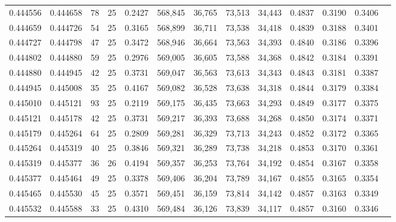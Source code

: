 \begin{tabular}{rrrrrrrrrrrrr}
0.444556 & 0.444658 &    78 &  25 &                                     0.2427 & 568,845 &  36,765 &  73,513 &  34,443 & 0.4837 & 0.3190 & 0.3406 \\
0.444659 & 0.444726 &    54 &  25 &                                     0.3165 & 568,899 &  36,711 &  73,538 &  34,418 & 0.4839 & 0.3188 & 0.3401 \\
0.444727 & 0.444798 &    47 &  25 &                                     0.3472 & 568,946 &  36,664 &  73,563 &  34,393 & 0.4840 & 0.3186 & 0.3396 \\
0.444802 & 0.444880 &    59 &  25 &                                     0.2976 & 569,005 &  36,605 &  73,588 &  34,368 & 0.4842 & 0.3184 & 0.3391 \\
0.444880 & 0.444945 &    42 &  25 &                                     0.3731 & 569,047 &  36,563 &  73,613 &  34,343 & 0.4843 & 0.3181 & 0.3387 \\
0.444945 & 0.445008 &    35 &  25 &                                     0.4167 & 569,082 &  36,528 &  73,638 &  34,318 & 0.4844 & 0.3179 & 0.3384 \\
0.445010 & 0.445121 &    93 &  25 &                                     0.2119 & 569,175 &  36,435 &  73,663 &  34,293 & 0.4849 & 0.3177 & 0.3375 \\
0.445121 & 0.445178 &    42 &  25 &                                     0.3731 & 569,217 &  36,393 &  73,688 &  34,268 & 0.4850 & 0.3174 & 0.3371 \\
0.445179 & 0.445264 &    64 &  25 &                                     0.2809 & 569,281 &  36,329 &  73,713 &  34,243 & 0.4852 & 0.3172 & 0.3365 \\
0.445264 & 0.445319 &    40 &  25 &                                     0.3846 & 569,321 &  36,289 &  73,738 &  34,218 & 0.4853 & 0.3170 & 0.3361 \\
0.445319 & 0.445377 &    36 &  26 &                                     0.4194 & 569,357 &  36,253 &  73,764 &  34,192 & 0.4854 & 0.3167 & 0.3358 \\
0.445377 & 0.445464 &    49 &  25 &                                     0.3378 & 569,406 &  36,204 &  73,789 &  34,167 & 0.4855 & 0.3165 & 0.3354 \\
0.445465 & 0.445530 &    45 &  25 &                                     0.3571 & 569,451 &  36,159 &  73,814 &  34,142 & 0.4857 & 0.3163 & 0.3349 \\
0.445532 & 0.445588 &    33 &  25 &                                     0.4310 & 569,484 &  36,126 &  73,839 &  34,117 & 0.4857 & 0.3160 & 0.3346 \\

\end{tabular}
